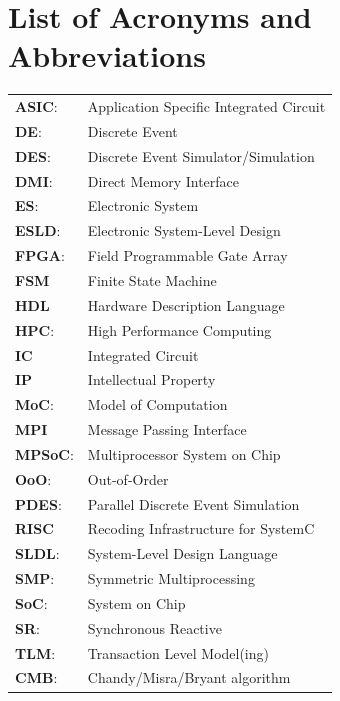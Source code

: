 \documentclass[11pt]{article}
\begin{document}
\setcounter{tocdepth}{3}
\tableofcontents
{}
\clearpage

\section*{List of Acronyms and Abbreviations}
\label{sec:orga7ffb70}
\begin{tabular}{ll}
\textbf{ASIC}: & Application Specific Integrated Circuit\\
\textbf{DE}: & Discrete Event\\
\textbf{DES}: & Discrete Event Simulator/Simulation\\
\textbf{DMI}: & Direct Memory Interface\\
\textbf{ES}: & Electronic System\\
\textbf{ESLD}: & Electronic System-Level Design\\
\textbf{FPGA}: & Field Programmable Gate Array\\
\textbf{FSM} & Finite State Machine\\
\textbf{HDL} & Hardware Description Language\\
\textbf{HPC}: & High Performance Computing\\
\textbf{IC} & Integrated Circuit\\
\textbf{IP} & Intellectual Property\\
\textbf{MoC}: & Model of Computation\\
\textbf{MPI} & Message Passing Interface\\
\textbf{MPSoC}: & Multiprocessor System on Chip\\
\textbf{OoO}: & Out-of-Order\\
\textbf{PDES}: & Parallel Discrete Event Simulation\\
\textbf{RISC} & Recoding Infrastructure for SystemC\\
\textbf{SLDL}: & System-Level Design Language\\
\textbf{SMP}: & Symmetric Multiprocessing\\
\textbf{SoC}: & System on Chip\\
\textbf{SR}: & Synchronous Reactive\\
\textbf{TLM}: & Transaction Level Model(ing)\\
\textbf{CMB}: & Chandy/Misra/Bryant algorithm\\
\end{tabular}
\clearpage
\end{document}
